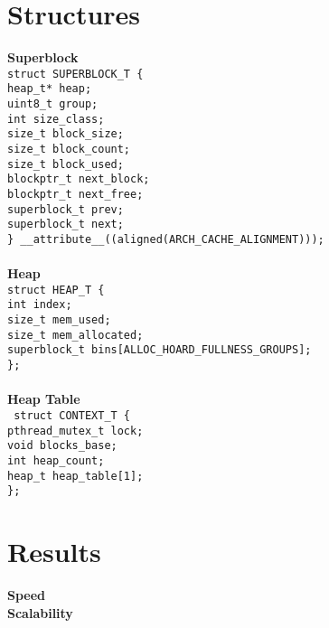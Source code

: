 \documentclass[11pt]{article}
\begin{document}
\newpage

\section{Structures}

\textbf{Superblock}
\texttt{
\\
struct SUPERBLOCK\_T \{
\\
\indent   heap\_t* heap;
\\
\indent   uint8\_t group;
\\
\indent    int size\_class;
\\
\indent    size\_t block\_size;
\\
\indent    size\_t block\_count;
\\
\indent    size\_t block\_used;
\\
\indent    blockptr\_t next\_block;
\\
\indent    blockptr\_t next\_free;
\\
\indent    superblock\_t\* prev;
\\
\indent    superblock\_t\* next;
\\
\} \_\_attribute\_\_((aligned(ARCH\_CACHE\_ALIGNMENT)));
}
\\
\\

\noindent \textbf{Heap}
\\
\texttt{struct HEAP\_T \{
\\
\indent    int index;
\\
\indent    size\_t mem\_used;
\\
 \indent   size\_t mem\_allocated;
\\
 \indent   superblock\_t\* bins[ALLOC\_HOARD\_FULLNESS\_GROUPS];
\\
\};}
\\
\\
\noindent \textbf{Heap Table}
\\
\texttt{
struct CONTEXT\_T \{
\\
\indent    pthread\_mutex\_t lock;
\\
\indent    void\* blocks\_base;
\\
\indent    int heap\_count;
\\
 \indent   heap\_t heap\_table[1];
\\
\};}


\newpage
\noindent
\section{Results}
\textbf{Speed}
\\
\textbf{Scalability}
\\
\end{document}
